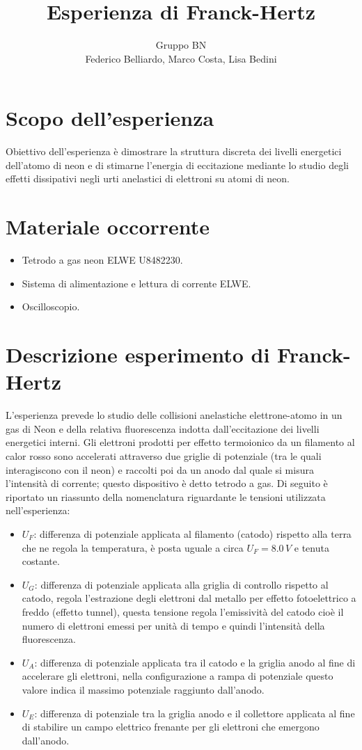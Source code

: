 \documentclass[10pt,a4paper]{article}
\author{Gruppo BN \\ Federico Belliardo, Marco Costa, Lisa Bedini}
\title{Esperienza di Franck-Hertz}
\begin{document}
\maketitle
\section{Scopo dell'esperienza}
Obiettivo dell'esperienza è dimostrare la struttura discreta dei livelli energetici dell'atomo di neon e di stimarne l'energia di eccitazione mediante lo studio degli effetti dissipativi negli urti anelastici di elettroni su atomi di neon.\\

\section{Materiale occorrente}
\begin{itemize}
\item Tetrodo a gas neon ELWE U8482230.
\item Sistema di alimentazione e lettura di corrente ELWE.
\item Oscilloscopio.
\end{itemize}

\section{Descrizione esperimento di Franck-Hertz}
L'esperienza prevede lo studio delle collisioni anelastiche elettrone-atomo in un gas di Neon e della relativa fluorescenza indotta dall'eccitazione dei livelli energetici interni. Gli elettroni prodotti per effetto termoionico da un filamento al calor rosso sono accelerati attraverso due griglie di potenziale (tra le quali interagiscono con il neon) e raccolti poi da un anodo dal quale si misura l'intensità di corrente; questo dispositivo è detto tetrodo a gas.
Di seguito è riportato un riassunto della nomenclatura riguardante le tensioni utilizzata nell'esperienza:

\begin{itemize}
\item $U_F$: differenza di potenziale applicata al filamento (catodo) rispetto alla terra che ne regola la temperatura, è posta uguale a circa $U_F = 8.0 \,V$ e tenuta costante.
\item $U_G$: differenza di potenziale applicata alla griglia di controllo rispetto al catodo, regola l'estrazione degli elettroni dal metallo per effetto fotoelettrico a freddo (effetto tunnel), questa tensione regola l'emissività del catodo cioè il numero di elettroni emessi per unità di tempo e quindi l'intensità della fluorescenza.
\item $U_A$: differenza di potenziale applicata tra il catodo e la griglia anodo al fine di accelerare gli elettroni, nella configurazione a rampa di potenziale questo valore indica il massimo potenziale raggiunto dall'anodo.
\item $U_E$: differenza di potenziale tra la griglia anodo e il collettore applicata al fine di stabilire un campo elettrico frenante per gli elettroni che emergono dall'anodo.
\end{itemize}
\end{document}
